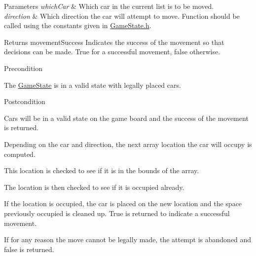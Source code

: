 \begin{DoxyParams}{\-Parameters}
{\em which\-Car} & \-Which car in the current list is to be moved. \\
\hline
{\em direction} & \-Which direction the car will attempt to move. \-Function should be called using the constants given in \hyperlink{_game_state_8h}{\-Game\-State.\-h}.\\
\hline
\end{DoxyParams}
\begin{DoxyReturn}{\-Returns}
movement\-Success \-Indicates the success of the movement so that decisions can be made. \-True for a successful movement, false otherwise.
\end{DoxyReturn}
\begin{DoxyPrecond}{\-Precondition}

\begin{DoxyEnumerate}
\item \-The \hyperlink{class_game_state}{\-Game\-State} is in a valid state with legally placed cars.
\end{DoxyEnumerate}
\end{DoxyPrecond}
\begin{DoxyPostcond}{\-Postcondition}

\begin{DoxyEnumerate}
\item \-Cars will be in a valid state on the game board and the success of the movement is returned.
\end{DoxyEnumerate}
\end{DoxyPostcond}

\begin{DoxyEnumerate}
\item \-Depending on the car and direction, the next array location the car will occupy is computed.
\item \-This location is checked to see if it is in the bounds of the array.
\item \-The location is then checked to see if it is occupied already.
\item \-If the location is occupied, the car is placed on the new location and the space previously occupied is cleaned up. \-True is returned to indicate a successful movement.
\item \-If for any reason the move cannot be legally made, the attempt is abandoned and false is returned.
\end{DoxyEnumerate}


